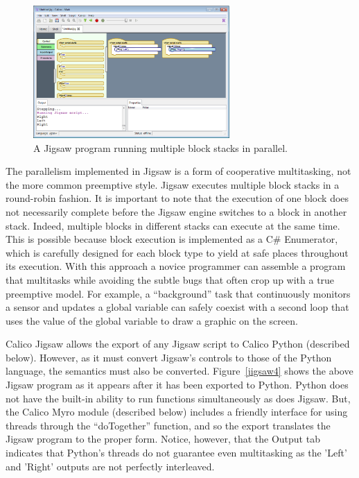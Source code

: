 \documentclass[preprint]{sigplanconf}
\begin{document}
\begin{figure}[h!]
  \centering
    \includegraphics[width=75mm]{jigsaw3.eps} 
  \caption{A Jigsaw program running multiple block stacks in parallel.}
  \label{jigsaw3}
\end{figure}

The parallelism implemented in Jigsaw is a form of
cooperative multitasking, not the more common preemptive style. Jigsaw
executes multiple block stacks in a round-robin fashion. It is
important to note that the execution of one block does not necessarily
complete before the Jigsaw engine switches to a block in another
stack. Indeed, multiple blocks in different stacks can execute at the
same time. This is possible because block execution is implemented 
as a C\# Enumerator, which is carefully designed for each block type
to yield at safe places throughout its execution. With this
approach a novice programmer can assemble a program that
multitasks while avoiding the subtle bugs that often crop 
up with a true preemptive model. For example, a ``background'' task
that continuously monitors a sensor and updates a global variable 
can safely coexist with a second loop that uses the value of the global
variable to draw a graphic on the screen.

Calico Jigsaw allows the export of any Jigsaw script to Calico Python
(described below). However, as it must convert Jigsaw's controls to
those of the Python language, the semantics must also be
converted. Figure~\ref{jigsaw4} shows the above Jigsaw program as it
appears after it has been exported to Python. Python does not have the
built-in ability to run functions simultaneously as does Jigsaw. But,
the Calico Myro module (described below) includes a friendly interface
for using threads through the ``doTogether'' function, and so the
export translates the Jigsaw program to the proper form. Notice,
however, that the Output tab indicates that Python's threads do not
guarantee even multitasking as the 'Left' and 'Right' outputs are not
perfectly interleaved.
\end{document}
